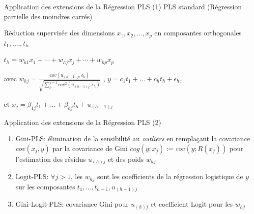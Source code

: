 \documentclass[newPxFont,pagenumber]{beamer}
\begin{document}
%
%
%
%
%

\begin{frame}{Application des extensions de la Régression PLS (1)}
 PLS standard (Régression partielle des moindres carrés) 
 
 Réduction supervisée des dimensions $x_1, x_2, ..., x_p$ en composantes orthogonales $t_1, ...., t_h$

$t_h = w_{h1} x_1 + \cdots + w_{hj} x_j + \cdots + w_{hp} x_p$

avec $w_{hj} = \frac{cov(u_{(h-1)j}, \epsilon_h)}{\sqrt{\sum_p^{j=1} cov^2(u_{(h-1)j}, \epsilon_h)}}$
, $y=c_1 t_1 + ... + c_h t_h + \epsilon_h$,

et $x_j=\beta_{1j} t_1 + ... + \beta_{hj} t_h + u_{(h-1)j}$


\end{frame}

\begin{frame}{Application des extensions de la Régression PLS (2)}

\begin{enumerate}
\setlength\itemsep{1.5em}

\item Gini-PLS: 
élimination de la sensibilité au \textit{outliers} en remplaçant la covariance $cov(x_j, y)$ par la covariance de Gini $cog(y; x_j) := cov(y; R(x_j))$ pour l'estimation des résidus $u_{(h)j}$ et des poids $w_{hj}$ \cite{souissi2013gini}

\item Logit-PLS:  $\forall j > 1$, les $w_{hj} $ sont les coefficients de la régression logistique de $y$ sur les composantes $t_1, ..., t_{h-1}, u_{(h-1)j}$ \cite{tenenhaus2005logitpls}

\item Gini-Logit-PLS: covariance Gini pour $u_{(h)j}$ et coefficient Logit pour les $w_{hj}$
\end{enumerate}
\end{frame}
\end{document}
